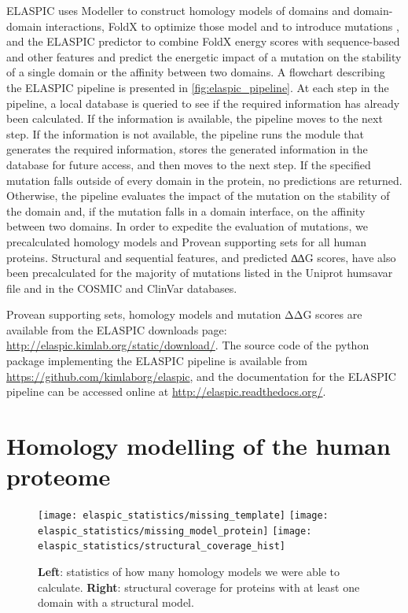 ELASPIC uses Modeller \cite{webb_comparative_2002} to construct homology models of domains and domain-domain interactions, FoldX to optimize those model and to introduce mutations \cite{schymkowitz_foldx_2005}, and the ELASPIC predictor to combine FoldX energy scores with sequence-based and other features and predict the energetic impact of a mutation on the stability of a single domain or the affinity between two domains. A flowchart describing the ELASPIC pipeline is presented in \ref{fig:elaspic_pipeline}. At each step in the pipeline, a local database is queried to see if the required information has already been calculated. If the information is available, the pipeline moves to the next step. If the information is not available, the pipeline runs the module that generates the required information, stores the generated information in the database for future access, and then moves to the next step. If the specified mutation falls outside of every domain in the protein, no predictions are returned. Otherwise, the pipeline evaluates the impact of the mutation on the stability of the domain and, if the mutation falls in a domain interface, on the affinity between two domains. In order to expedite the evaluation of mutations, we precalculated homology models and Provean supporting sets for all human proteins. Structural and sequential features, and predicted ∆∆G scores, have also been precalculated for the majority of mutations listed in the Uniprot humsavar file \cite{consortium_uniprot:_2015} and in the COSMIC \cite{forbes_cosmic:_2015} and ClinVar \cite{landrum_clinvar:_2016} databases.

Provean supporting sets, homology models and mutation ΔΔG scores are available from the ELASPIC
downloads page: \url{http://elaspic.kimlab.org/static/download/}. The source code of the python package implementing the ELASPIC pipeline is available from \url{https://github.com/kimlaborg/elaspic}, and the documentation for the ELASPIC pipeline can be accessed online at \url{http://elaspic.readthedocs.org/}.

\section{Homology modelling of the human proteome}

\begin{figure}[H]
	\centering
	\texttt{[image: elaspic\_statistics/missing\_template]}
	\texttt{[image: elaspic\_statistics/missing\_model\_protein]}
	\texttt{[image: elaspic\_statistics/structural\_coverage\_hist]}
	\caption{\textbf{Left}: statistics of how many homology models we were able to calculate. \textbf{Right}: structural coverage for proteins with at least one domain with a structural model.}
\end{figure}



